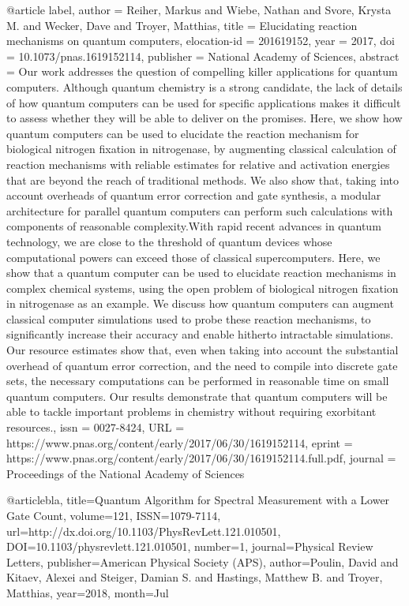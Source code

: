 @article {label,
	author = {Reiher, Markus and Wiebe, Nathan and Svore, Krysta M. and Wecker, Dave and Troyer, Matthias},
	title = {Elucidating reaction mechanisms on quantum computers},
	elocation-id = {201619152},
	year = {2017},
	doi = {10.1073/pnas.1619152114},
	publisher = {National Academy of Sciences},
	abstract = {Our work addresses the question of compelling killer applications for quantum computers. Although quantum chemistry is a strong candidate, the lack of details of how quantum computers can be used for specific applications makes it difficult to assess whether they will be able to deliver on the promises. Here, we show how quantum computers can be used to elucidate the reaction mechanism for biological nitrogen fixation in nitrogenase, by augmenting classical calculation of reaction mechanisms with reliable estimates for relative and activation energies that are beyond the reach of traditional methods. We also show that, taking into account overheads of quantum error correction and gate synthesis, a modular architecture for parallel quantum computers can perform such calculations with components of reasonable complexity.With rapid recent advances in quantum technology, we are close to the threshold of quantum devices whose computational powers can exceed those of classical supercomputers. Here, we show that a quantum computer can be used to elucidate reaction mechanisms in complex chemical systems, using the open problem of biological nitrogen fixation in nitrogenase as an example. We discuss how quantum computers can augment classical computer simulations used to probe these reaction mechanisms, to significantly increase their accuracy and enable hitherto intractable simulations. Our resource estimates show that, even when taking into account the substantial overhead of quantum error correction, and the need to compile into discrete gate sets, the necessary computations can be performed in reasonable time on small quantum computers. Our results demonstrate that quantum computers will be able to tackle important problems in chemistry without requiring exorbitant resources.},
	issn = {0027-8424},
	URL = {https://www.pnas.org/content/early/2017/06/30/1619152114},
	eprint = {https://www.pnas.org/content/early/2017/06/30/1619152114.full.pdf},
	journal = {Proceedings of the National Academy of Sciences}
}

@article{bla,
   title={Quantum Algorithm for Spectral Measurement with a Lower Gate Count},
   volume={121},
   ISSN={1079-7114},
   url={http://dx.doi.org/10.1103/PhysRevLett.121.010501},
   DOI={10.1103/physrevlett.121.010501},
   number={1},
   journal={Physical Review Letters},
   publisher={American Physical Society (APS)},
   author={Poulin, David and Kitaev, Alexei and Steiger, Damian S. and Hastings, Matthew B. and Troyer, Matthias},
   year={2018},
   month={Jul}
}

